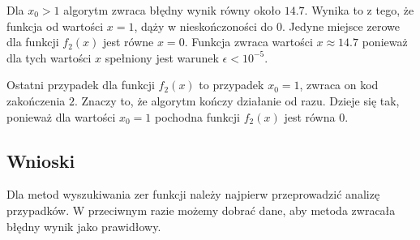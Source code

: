 \documentclass{article}
\begin{document}
Dla $x_0 > 1$ algorytm zwraca błędny wynik równy około $14.7$. Wynika to z tego, że funkcja od wartości $x=1$, dąży w nieskończoności do $0$. Jedyne miejsce zerowe dla funkcji $f_2(x)$ jest równe $x=0$. Funkcja zwraca wartości $x \approx 14.7$ ponieważ dla tych wartości $x$ spełniony jest warunek $\epsilon<10^{-5}$.

Ostatni przypadek dla funkcji $f_2(x)$ to przypadek $x_0=1$, zwraca on kod zakończenia $2$. Znaczy to, że algorytm kończy działanie od razu. Dzieje się tak, ponieważ dla wartości $x_0=1$ pochodna funkcji $f_2(x)$ jest równa $0$.
\subsection*{Wnioski}
Dla metod wyszukiwania zer funkcji należy najpierw przeprowadzić analizę przypadków. W przeciwnym razie możemy dobrać dane, aby metoda zwracała błędny wynik jako prawidłowy. 
\end{document}
